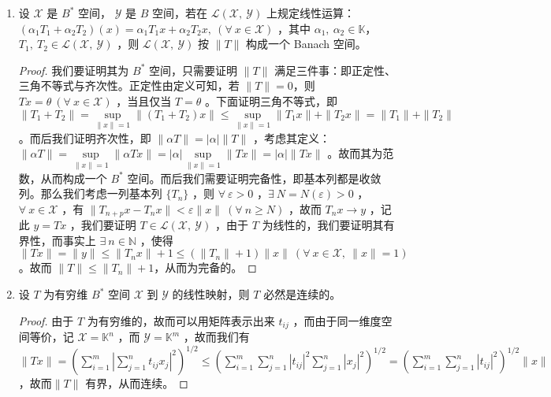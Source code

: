 \begin{enumerate}[leftmargin=2cm, label=\arabic*]
\begin{proof}
			必要性：若 $T$ 连续，则我们考虑另一种方式来证明，由于其连续，则 $\forall\ \|x\|_{\mathscr{X}}\leqslant \delta$，$\|Tx\|_{\mathscr{Y}} \leqslant \varepsilon$ ，那么我们考虑 $\|x_0\|\leqslant \delta$ ，取 $y\in D(T)$ ，考虑$x = \frac{y}{\|y\|x_0}\delta$ ，则 $\|Tx\|_{\mathscr{Y}} = \frac{\delta}{\|y\| x_0} \|Ty\|_{\mathscr{Y}} < \varepsilon$ ，故而有 $\|Ty\|_{\mathscr{Y}} < \varepsilon \frac{x_0}{\delta} \|y\| \leqslant M \|y\|$ ，故而其有界。\textcolor{blue}{我们亦可考虑利用反证法，原理同上。}
		\end{proof}
		\item 设 $\mathscr{X}$ 是 $B^*$ 空间， $\mathscr{Y}$ 是 $B$ 空间，若在 $\mathscr{L}(\mathscr{X},\ \mathscr{Y})$ 上规定线性运算：$(\alpha_1 T_1 + \alpha_2 T_2) (x) = \alpha_1 T_1 x + \alpha_2 T_2 x,\ (\forall\ x\in \mathscr{X})$ ，其中 $\alpha_1,\ \alpha_2\in\mathbb{K}$，$T_1,\ T_2\in\mathscr{L}(\mathscr{X},\ \mathscr{Y})$ ，则 $\mathscr{L}(\mathscr{X},\ \mathscr{Y})$ 按 $\|T\|$ 构成一个 Banach 空间。
		\begin{proof}
			我们要证明其为 $B^*$ 空间，只需要证明 $\|T\|$ 满足三件事：即正定性、三角不等式与齐次性。正定性由定义可知，若 $\|T\| = 0$，则 $Tx = \theta\ (\forall\ x\in\mathscr{X})$   ，当且仅当 $T = \theta$ 。下面证明三角不等式，即 $\|T_1 + T_2\| = \sup\limits_{\|x\|=1} \|(T_1 + T_2)x\| \leqslant \sup\limits_{\|x\|=1} \|T_1x\| + \|T_2x\| = \|T_1\| + \|T_2\|$ 。而后我们证明齐次性，即 $\|\alpha T\| = |\alpha| \|T\|$ ，考虑其定义：$\|\alpha T\| = \sup\limits_{\|x\| = 1} \|\alpha T x\| = |\alpha| \sup\limits_{\|x\|=1} \|Tx\|  = |\alpha| \|Tx\|$ 。故而其为范数，从而构成一个 $B^*$ 空间。而后我们需要证明完备性，即基本列都是收敛列。那么我们考虑一列基本列 $\{T_n\}$ ，则 $\forall\ \varepsilon > 0$ ，$\exists\ N = N(\varepsilon) > 0$ ，$\forall\ x\in\mathscr{X}$ ，有 $\|T_{n+p}x - T_n x\| < \varepsilon\|x\| \ (\forall\ n\geqslant N)$ ，故而 $T_n x \to y$ ，记此 $y = Tx$ ，我们要证明 $T\in \mathscr{L}(\mathscr{X},\ \mathscr{Y})$ ，由于 $T$ 为线性的，我们要证明其有界性，而事实上 $\exists\ n\in\mathbb{N}$ ，使得 $\|Tx\| = \|y\| \leqslant \|T_nx\| + 1 \leqslant (\|T_n\| + 1) \|x\| \ (\forall\ x\in\mathscr{X},\ \|x\| = 1) $。故而 $\|T\| \leqslant \|T_n\| + 1$，从而为完备的。
		\end{proof}
		\item 设 $T$ 为有穷维 $B^*$ 空间 $\mathscr{X}$ 到 $\mathscr{Y}$ 的线性映射，则 $T$ 必然是连续的。
		\begin{proof}
			由于 $T$ 为有穷维的，故而可以用矩阵表示出来 $t_{ij}$ ，而由于同一维度空间等价，记 $\mathscr{X} = \mathbb{K}^n$ ，而 $\mathscr{Y} = \mathbb{K}^m$ ，故而我们有 $\|Tx\| = \left(\sum\limits_{i=1}^m\left|\sum\limits_{j=1}^n t_{ij}x_j\right|^2 \right)^{1/2} \leqslant \left(\sum\limits_{i=1}^m \sum\limits_{j=1}^n |t_{ij}|^2 \sum\limits_{j=1}^n |x_j|^2 \right)^{1/2} = \left(\sum\limits_{i=1}^m \sum\limits_{j=1}^n |t_{ij}|^2 \right)^{1/2}\|x\|$ ，故而$\|T\|$ 有界，从而连续。 

\end{proof}
\end{enumerate}
